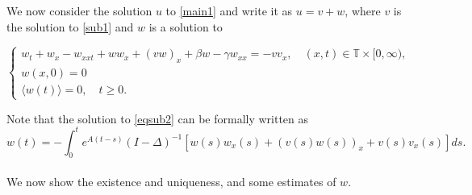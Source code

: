 \documentclass[10pt,a4paper,final]{article}
\numberwithin{equation}{section}
\newcommand{\bT}{\mathbb{T}}
\newcommand{\Gb}{\beta}
\newcommand{\Gg}{\gamma}
\begin{document}
We now consider the solution $u$ to \eqref{main1} and write it as $u=v+w$, where $v$ is the solution to \eqref{sub1} and $w$ is a solution to 

\begin{equation}\label{eqsub2}
\begin{cases}
    w_t+w_x-w_{xxt}+ww_x+(vw)_x+\Gb w-\Gg w_{xx}=-vv_x,  \quad (x, t)\in \bT\times [0, \infty),&\\
    w(x,0)=0&\\
    \langle w(t)\rangle =0, \quad t\geq 0.&
    \end{cases}
\end{equation}

Note that the solution to \eqref{eqsub2} can be formally written as $$ w(t)=-\int_0^t e^{A(t-s)}(I-\Delta)^{-1}[w(s)w_x(s)+(v(s)w(s))_x+v(s)v_x(s)]ds.$$
\\

We now show the existence and uniqueness, and some estimates of $w$.
\end{document}
